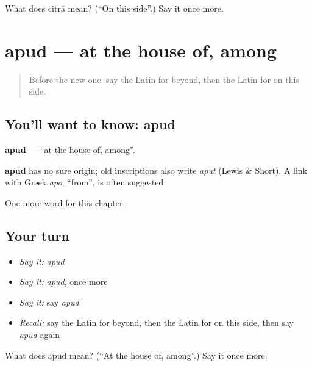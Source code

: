 \begin{tcolorbox}[breakable,colback=teal!4,colframe=teal!35!black,title={Before you move on}]
What does citrā mean? (\textquotedblleft{}On this side\textquotedblright{}.) Say it once more.
\end{tcolorbox}
\section[apud]{apud — at the house of, among}

\label{lesson:LA-C238-apud}



\begin{quote}
Before the new one: say the Latin for beyond, then the Latin for on this side.
\end{quote}

\subsection*{You'll want to know: apud}
\textbf{apud} — \textquotedblleft{}at the house of, among\textquotedblright{}.

\begin{cousinweb}
\textbf{apud} has no sure origin; old inscriptions also write \emph{aput} (Lewis \& Short). A link with Greek \emph{apo}, \textquotedblleft{}from\textquotedblright{}, is often suggested.
\end{cousinweb}

\begin{grammarlens}[title={What you've built}]
One more word for this chapter.
\end{grammarlens}

\subsection*{Your turn}
\begin{itemize}
\raggedright
  \item \emph{Say it:} \emph{apud}
  \item \emph{Say it:} \emph{apud}, once more
  \item \emph{Say it:} say \emph{apud}
  \item \emph{Recall:} say the Latin for beyond, then the Latin for on this side, then say \emph{apud} again
\end{itemize}

\begin{tcolorbox}[breakable,colback=teal!4,colframe=teal!35!black,title={Before you move on}]
What does apud mean? (\textquotedblleft{}At the house of, among\textquotedblright{}.) Say it once more.
\end{tcolorbox}

